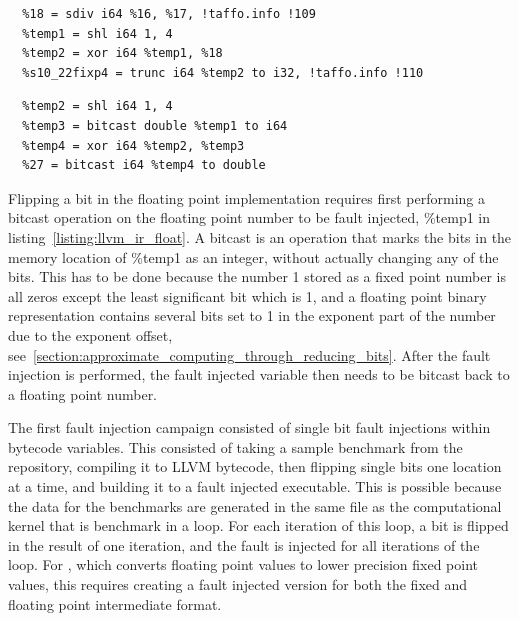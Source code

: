\begin{lstlisting}[caption=fixed point bit flip in LLVM bytecode, label=listing:llvm_ir_fixed]
  %17 = sext i32 %0 to i64, !taffo.info !45
  %18 = sdiv i64 %16, %17, !taffo.info !109
  %temp1 = shl i64 1, 4
  %temp2 = xor i64 %temp1, %18
  %s10_22fixp4 = trunc i64 %temp2 to i32, !taffo.info !110
\end{lstlisting} 

\begin{lstlisting}[caption=floating point bit flip in LLVM bytecode, label=listing:llvm_ir_float]
  %temp1 = fdiv double %24, %26
  %temp2 = shl i64 1, 4
  %temp3 = bitcast double %temp1 to i64
  %temp4 = xor i64 %temp2, %temp3
  %27 = bitcast i64 %temp4 to double
\end{lstlisting}

Flipping a bit in the floating point implementation requires first performing a bitcast operation on the floating point number to be fault injected, \%temp1 in listing~\ref{listing:llvm_ir_float}. A bitcast is an operation that marks the bits in the memory location of \%temp1 as an integer, without actually changing any of the bits. This has to be done because the number 1 stored as a fixed point number is all zeros except the least significant bit which is 1, and a floating point binary representation contains several bits set to 1 in the exponent part of the number due to the exponent offset, see~\ref{section:approximate_computing_through_reducing_bits}. After the fault injection is performed, the fault injected variable then needs to be bitcast back to a floating point number.

The first fault injection campaign consisted of single bit fault injections within bytecode variables. This consisted of taking a sample benchmark from the \taffo{} repository, compiling it to LLVM bytecode, then flipping single bits one location at a time, and building it to a fault injected executable. This is possible because the data for the benchmarks are generated in the same file as the computational kernel that is benchmark in a loop. For each iteration of this loop, a bit is flipped in the result of one iteration, and the fault is injected for all iterations of the loop. For \taffo{}, which converts floating point values to lower precision fixed point values, this requires creating a fault injected version for both the fixed and floating point intermediate format.


